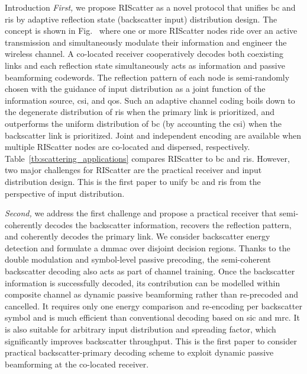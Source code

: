 \documentclass[journal]{IEEEtran}
\begin{document}
\begin{section}{Introduction}
	\emph{First,} we propose RIScatter as a novel protocol that unifies \gls{bc} and \gls{ris} by adaptive reflection state (backscatter input) distribution design.
	The concept is shown in Fig.~ where one or more RIScatter nodes ride over an active transmission and simultaneously modulate their information and engineer the wireless channel.
	A co-located receiver cooperatively decodes both coexisting links and each reflection state simultaneously acts as information and passive beamforming codewords.
	The reflection pattern of each node is semi-randomly chosen with the guidance of input distribution as a joint function of the information source, \gls{csi}, and \gls{qos}.
	Such an adaptive channel coding boils down to the degenerate distribution of \gls{ris} when the primary link is prioritized, and outperforms the uniform distribution of \gls{bc} (by accounting the \gls{csi}) when the backscatter link is prioritized.
	Joint and independent encoding are available when multiple RIScatter nodes are co-located and dispersed, respectively.
	Table~\ref{tb:scattering_applications} compares RIScatter to \gls{bc} and \gls{ris}.
	However, two major challenges for RIScatter are the practical receiver and input distribution design.
	This is the first paper to unify \gls{bc} and \gls{ris} from the perspective of input distribution.

	\emph{Second,} we address the first challenge and propose a practical receiver that semi-coherently decodes the backscatter information, recovers the reflection pattern, and coherently decodes the primary link.
	We consider backscatter energy detection and formulate a \gls{dmmac} over disjoint decision regions.
	Thanks to the double modulation and symbol-level passive precoding, the semi-coherent backscatter decoding also acts as part of channel training.
	Once the backscatter information is successfully decoded, its contribution can be modelled within composite channel as dynamic passive beamforming rather than re-precoded and cancelled.
	It requires only one energy comparison and re-encoding per backscatter symbol and is much efficient than conventional decoding based on \gls{sic} and \gls{mrc}.
	It is also suitable for arbitrary input distribution and spreading factor, which significantly improves backscatter throughput.
	This is the first paper to consider practical backscatter-primary decoding scheme to exploit dynamic passive beamforming at the co-located receiver.


\end{section}
\end{document}
